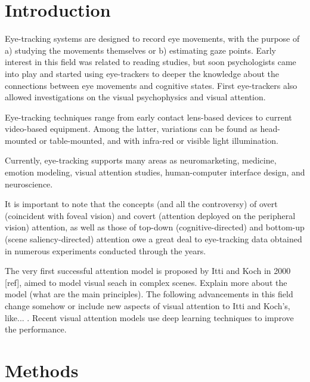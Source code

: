 \documentclass{article}
\begin{document}
\section{Introduction}
\label{sec:int}
Eye-tracking systems are designed to record eye movements, with the purpose of a) studying the movements themselves or b) estimating gaze points. Early interest in this field was related to reading studies, but soon psychologists came into play and started using eye-trackers to deeper the knowledge about the connections between eye movements and cognitive states. First eye-trackers also allowed investigations on the visual psychophysics and visual attention. 

Eye-tracking techniques range from early contact lens-based devices to current video-based equipment. Among the latter, variations can be found as head-mounted or table-mounted, and with infra-red or visible light illumination.

Currently, eye-tracking supports many areas as neuromarketing, medicine, emotion modeling, visual attention studies, human-computer interface design, and neuroscience.

It is important to note that the concepts (and all the controversy) of overt (coincident with foveal vision) and covert (attention deployed on the peripheral vision) attention, as well as those of top-down (cognitive-directed) and bottom-up (scene saliency-directed) attention owe a great deal to eye-tracking data obtained in numerous experiments conducted through the years.

The very first successful attention model is proposed by Itti and Koch in 2000 [ref], aimed to model visual seach in complex scenes. Explain more about the model (what are the main principles). The following advancements in this field change somehow or include new aspects of visual attention to Itti and Koch's, like... . Recent visual attention models use deep learning techniques to improve the performance.



\section{Methods}
\label{sec:met}
\end{document}
